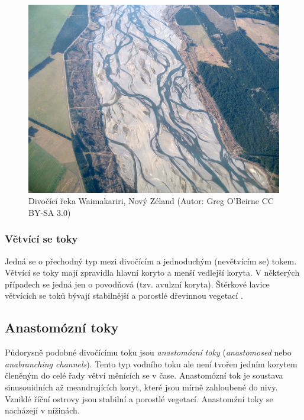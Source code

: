 \begin{figure}[h]
	\centering
	\includegraphics[width=1\linewidth]{obrazky/fluvial/divocici}
	\caption{Divočící řeka Waimakariri, Nový Zéland (Autor: Greg O'Beirne CC BY-SA 3.0)}
	\label{fig:divocici}
\end{figure}

\subsubsection{Větvící se toky}
Jedná se o přechodný typ mezi divočícím a jednoduchým (nevětvícím se) tokem. Větvící se toky mají zpravidla hlavní koryto a menší vedlejší koryta. V některých případech se jedná jen o povodňová (tzv. avulzní koryta). Štěrkové lavice větvících se toků bývají stabilnější a porostlé dřevinnou vegetací \parencite{galiaFluvialniGeomorfologie2017}.

\subsection{Anastomózní toky}
Půdorysně podobné divočícímu toku jsou \emph{anastomózní toky} (\textit{anastomosed} nebo \textit{anabranching channels}). Tento typ vodního toku ale není tvořen jedním korytem členěným do celé řady větví měnících se v čase. Anastomózní tok je soustava sinusouidních až meandrujících koryt, které jsou mírně zahloubené do nivy. Vzniklé říční ostrovy jsou stabilní a porostlé vegetací. Anastomźní toky se nacházejí v nížinách.


